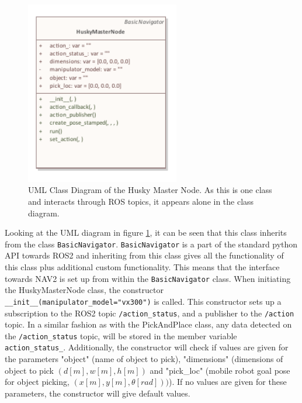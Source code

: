 
%


\begin{figure}[htp]
  \centering
  \includegraphics[width = 0.6\textwidth]{Figures/husky_master.pdf}
  \caption{UML Class Diagram of the Husky Master Node. As this is one class and interacts through ROS topics, it appears alone in the class diagram.}
  \label{fig:M:TL:huskyMasterUML}
\end{figure}

Looking at the UML diagram in figure \ref{fig:M:TL:huskyMasterUML}, it can be seen that this class inherits from the class \lstinline{BasicNavigator}. \lstinline{BasicNavigator} is a part of the standard python API towards ROS2 and inheriting from this class gives all the functionality of this class plus additional custom functionality. This means that the interface towards NAV2 is set up from within the \lstinline{BasicNavigator} class. When initiating the HuskyMasterNode class, the constructor \lstinline{__init__(manipulator_model="vx300")} is called. This constructor sets up a subscription to the ROS2 topic \lstinline{/action_status}, and a publisher to the \lstinline{/action} topic. In a similar fashion as with the PickAndPlace class, any data detected on the \lstinline{/action_status} topic, will be stored in the member variable \lstinline{action_status_}. Additionally, the constructor will check if values are given for the parameters "object" (name of object to pick), "dimensions" (dimensions of object to pick $(d[m], w[m], h[m])$ and "pick\_loc" (mobile robot goal pose for object picking, $(x[m], y[m], \theta[rad]))$). If no values are given for these parameters, the constructor will give default values. 

